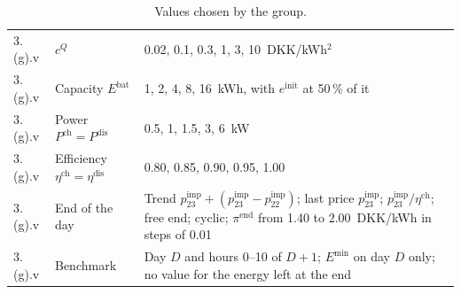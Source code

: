 \documentclass[12pt,oneside,a4paper,english]{article}
\newcommand{\pimp}[1][t]{p^{\mathrm{imp}}_{#1}}        %
\newcommand{\Emin}{E^{\min}}
\newcommand{\Ebat}{E^{\mathrm{bat}}}
\newcommand{\Pch}{P^{\mathrm{ch}}}
\newcommand{\Pdis}{P^{\mathrm{dis}}}
\newcommand{\etach}{\eta^{\mathrm{ch}}}
\newcommand{\etadis}{\eta^{\mathrm{dis}}}
\newcommand{\einit}{e^{\mathrm{init}}}
\newcommand{\piend}{\pi^{\mathrm{end}}}
\begin{document}
\begin{table}[H]
\begin{tabularx}{\textwidth}{llX}
3.(g).v & $c^{Q}$ & 0.02, 0.1, 0.3, 1, 3, 10~DKK/kWh$^2$ \\
3.(g).v & Capacity $\Ebat$ & 1, 2, 4, 8, 16~kWh, with $\einit$ at 50\,\% of it \\
3.(g).v & Power $\Pch = \Pdis$ & 0.5, 1, 1.5, 3, 6~kW \\
3.(g).v & Efficiency $\etach = \etadis$ & 0.80, 0.85, 0.90, 0.95, 1.00 \\
3.(g).v & End of the day & Trend $\pimp[23] + (\pimp[23] - \pimp[22])$; last price $\pimp[23]$; $\pimp[23]/\etach$; free end; cyclic; $\piend$ from 1.40 to 2.00~DKK/kWh in steps of 0.01 \\
3.(g).v & Benchmark & Day $D$ and hours 0--10 of $D+1$; $\Emin$ on day $D$ only; no value for the energy left at the end \\
\bottomrule
\end{tabularx}
\caption{Values chosen by the group.}
\label{tab:appendix}
\end{table}


\label{endOfDoc}
\label{EndOfText}
\end{document}
